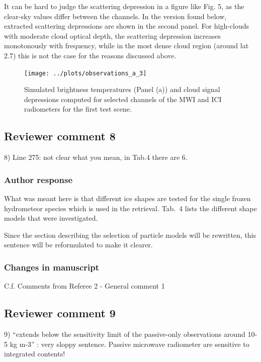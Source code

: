 It can be hard to judge the scattering depression in a figure like Fig. 5, as
the clear-sky values differ between the channels. In the version found below,
extracted scattering depressions are shown in the second panel. For high-clouds
with moderate cloud optical depth, the scattering depression increases
monotonously with frequency, while in the most dense cloud region (around lat
2.7) this is not the case for the reasons discussed above.

\begin{figure}[!hbpt]
  \centering
  \texttt{[image: ../plots/observations\_a\_3]}
  \caption{Simulated brightness temperatures (Panel (a)) and cloud signal
    depressions computed for selected channels of the MWI and ICI radiometers
    for the first test scene.}
  \label{fig:depressions}
\end{figure}

\subsection*{Reviewer comment 8}
8) Line 275: not clear what you mean, in Tab.4 there are 6. 

\subsubsection*{Author response}

What was meant here is that different ice shapes are tested for the single
frozen hydrometeor species which is used in the retrieval. Tab.~4 lists the
different shape models that were investigated.

Since the section describing the selection of particle models will be rewritten,
this sentence will be reformulated to make it clearer.

\subsubsection*{Changes in manuscript}

C.f. Comments from Referee 2 - General comment 1

\subsection*{Reviewer comment 9}

9) “extends below the sensitivity limit of the passive-only observations around
10-5 kg m-3” : very sloppy sentence. Passive microwave radiometer are sensitive
to integrated contents!

